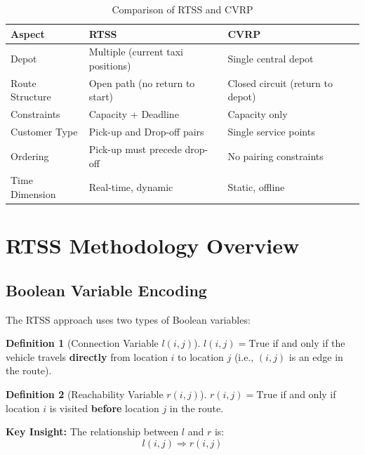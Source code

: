 \documentclass[12pt,a4paper]{article}
\theoremstyle{definition}
\newtheorem{definition}{Definition}[section]
\begin{document}
\begin{table}[H]
\centering
\begin{tabular}{|l|p{5cm}|p{5cm}|}
\hline
\textbf{Aspect} & \textbf{RTSS} & \textbf{CVRP} \\
\hline
Depot & Multiple (current taxi positions) & Single central depot \\
\hline
Route Structure & Open path (no return to start) & Closed circuit (return to depot) \\
\hline
Constraints & Capacity + Deadline & Capacity only \\
\hline
Customer Type & Pick-up and Drop-off pairs & Single service points \\
\hline
Ordering & Pick-up must precede drop-off & No pairing constraints \\
\hline
Time Dimension & Real-time, dynamic & Static, offline \\
\hline
\end{tabular}
\caption{Comparison of RTSS and CVRP}
\end{table}

\section{RTSS Methodology Overview}

\subsection{Boolean Variable Encoding}

The RTSS approach uses two types of Boolean variables:

\begin{definition}[Connection Variable $l(i,j)$]
$l(i,j) = \text{True}$ if and only if the vehicle travels \textbf{directly} from location $i$ to location $j$ (i.e., $(i,j)$ is an edge in the route).
\end{definition}

\begin{definition}[Reachability Variable $r(i,j)$]
$r(i,j) = \text{True}$ if and only if location $i$ is visited \textbf{before} location $j$ in the route.
\end{definition}

\textbf{Key Insight:} The relationship between $l$ and $r$ is:
\begin{equation}
l(i,j) \Rightarrow r(i,j)
\end{equation}
\end{document}
